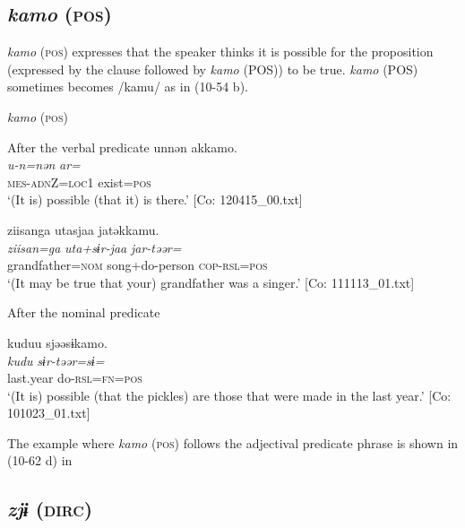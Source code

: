 \subsection{\textit{kamo} (\textsc{pos})}\label{sec:10.3.8}

\textit{kamo} (\textsc{pos}) expresses that the speaker thinks it is possible for the proposition (expressed by the clause followed by \textit{kamo} (POS)) to be true. \textit{kamo} (POS) sometimes becomes /kamu/ as in (10-54 b).

\ea\label{ex:10.54}   \textit{kamo} (\textsc{pos})\\
  \begin{xlist}
  \exi{} After the verbal predicate
  \ex  %
      \glll    unnən  akkamo.\\
      \textit{u-n=nən}  \textit{ar=}\\
      \textsc{mes}-\textsc{adn}Z=\textsc{loc}1  exist=\textsc{pos}\\
      \glt       ‘(It is) possible (that it) is there.’ [Co: 120415\_00.txt]

  \ex  %
      \glll    ziisanga  utasjaa  jatəkkamu.\\
      \textit{ziisan=ga}  \textit{uta+sɨr-jaa}  \textit{jar-təər=}\\
      grandfather=\textsc{nom}  song+do-person  \textsc{cop}-\textsc{rsl}=\textsc{pos}\\
      \glt       ‘(It may be true that your) grandfather was a singer.’ [Co: 111113\_01.txt]

  \exi{} After the nominal predicate

  \ex  %
      \glll    kuduu  sjəəsɨkamo.\\
      \textit{kudu}  \textit{sɨr-təər=sɨ=}\\
      last.year  do-\textsc{rsl}=\textsc{fn}=\textsc{pos}\\
      \glt       ‘(It is) possible (that the pickles) are those that were made in the last year.’ [Co: 101023\_01.txt]
    \end{xlist}
\z

The example where \textit{kamo} (\textsc{pos}) follows the adjectival predicate phrase is shown in (10-62 d) in 

\subsection{\textit{zjɨ} (\textsc{dirc})}\label{sec:10.3.9}

